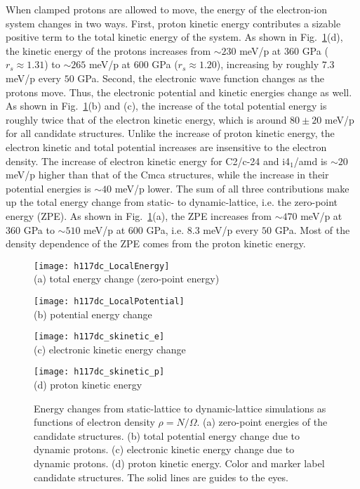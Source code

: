 When clamped protons are allowed to move, the energy of the electron-ion system changes in two ways.
First, proton kinetic energy contributes a sizable positive term to the total kinetic energy of the system. As shown in Fig.~\ref{fig:hsolid-ion-energy}(d), the kinetic energy of the protons increases from $\sim 230$ meV/p at $360$ GPa ($r_s\approx 1.31$) to $\sim 265$ meV/p at $600$ GPa ($r_s\approx 1.20$), increasing by roughly $7.3$ meV/p every $50$ GPa.
Second, the electronic wave function changes as the protons move. Thus, the electronic potential and kinetic energies change as well.
As shown in Fig.~\ref{fig:hsolid-ion-energy}(b) and (c), the increase of the total potential energy is roughly twice that of the electron kinetic energy, which is around $80\pm20$ meV/p for all candidate structures.
Unlike the increase of proton kinetic energy, the electron kinetic and total potential increases are insensitive to the electron density.
The increase of electron kinetic energy for C2/c-24 and i4$_1$/amd is $\sim 20$ meV/p higher than that of the Cmca structures, while the increase in their potential energies is $\sim 40$ meV/p lower.
The sum of all three contributions make up the total energy change from static- to dynamic-lattice, i.e. the zero-point energy (ZPE).
As shown in Fig.~\ref{fig:hsolid-ion-energy}(a), the ZPE increases from $\sim 470$ meV/p at $360$ GPa to $\sim 510$ meV/p at $600$ GPa, i.e. $8.3$ meV/p every $50$ GPa.
Most of the density dependence of the ZPE comes from the proton kinetic energy.

\begin{figure}[h]
\centering
\begin{minipage}{0.49\textwidth}
\centering
\texttt{[image: h117dc\_LocalEnergy]}\\
(a) total energy change (zero-point energy)
\end{minipage}
\begin{minipage}{0.49\textwidth}
\centering
\texttt{[image: h117dc\_LocalPotential]}\\
(b) potential energy change
\end{minipage}
\begin{minipage}{0.49\textwidth}
\centering
\texttt{[image: h117dc\_skinetic\_e]}\\
(c) electronic kinetic energy change
\end{minipage}
\begin{minipage}{0.49\textwidth}
\centering
\texttt{[image: h117dc\_skinetic\_p]}\\
(d) proton kinetic energy
\end{minipage}
\caption{Energy changes from static-lattice to dynamic-lattice simulations as functions of electron density $\rho=N/\Omega$. (a) zero-point energies of the candidate structures. (b) total potential energy change due to dynamic protons. (c) electronic kinetic energy change due to dynamic protons. (d) proton kinetic energy. Color and marker label candidate structures. The solid lines are guides to the eyes.}
\label{fig:hsolid-ion-energy}
\end{figure}

